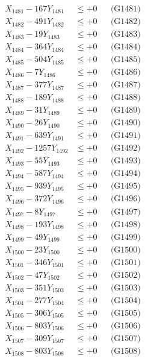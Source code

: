 \documentclass[a4paper,10pt]{article}
\begin{document}
{\begin{align}
\allowbreak
X_{1481} - 167Y_{1481} &\leq +0 && \text{(G1481)} \\
X_{1482} - 491Y_{1482} &\leq +0 && \text{(G1482)} \\
X_{1483} - 19Y_{1483} &\leq +0 && \text{(G1483)} \\
X_{1484} - 364Y_{1484} &\leq +0 && \text{(G1484)} \\
X_{1485} - 504Y_{1485} &\leq +0 && \text{(G1485)} \\
X_{1486} - 7Y_{1486} &\leq +0 && \text{(G1486)} \\
X_{1487} - 377Y_{1487} &\leq +0 && \text{(G1487)} \\
X_{1488} - 189Y_{1488} &\leq +0 && \text{(G1488)} \\
X_{1489} - 31Y_{1489} &\leq +0 && \text{(G1489)} \\
X_{1490} - 26Y_{1490} &\leq +0 && \text{(G1490)} \\
\allowbreak
X_{1491} - 639Y_{1491} &\leq +0 && \text{(G1491)} \\
X_{1492} - 1257Y_{1492} &\leq +0 && \text{(G1492)} \\
X_{1493} - 55Y_{1493} &\leq +0 && \text{(G1493)} \\
X_{1494} - 587Y_{1494} &\leq +0 && \text{(G1494)} \\
X_{1495} - 939Y_{1495} &\leq +0 && \text{(G1495)} \\
X_{1496} - 372Y_{1496} &\leq +0 && \text{(G1496)} \\
X_{1497} - 8Y_{1497} &\leq +0 && \text{(G1497)} \\
X_{1498} - 193Y_{1498} &\leq +0 && \text{(G1498)} \\
X_{1499} - 49Y_{1499} &\leq +0 && \text{(G1499)} \\
X_{1500} - 23Y_{1500} &\leq +0 && \text{(G1500)} \\
\allowbreak
X_{1501} - 346Y_{1501} &\leq +0 && \text{(G1501)} \\
X_{1502} - 47Y_{1502} &\leq +0 && \text{(G1502)} \\
X_{1503} - 351Y_{1503} &\leq +0 && \text{(G1503)} \\
X_{1504} - 277Y_{1504} &\leq +0 && \text{(G1504)} \\
X_{1505} - 306Y_{1505} &\leq +0 && \text{(G1505)} \\
X_{1506} - 803Y_{1506} &\leq +0 && \text{(G1506)} \\
X_{1507} - 309Y_{1507} &\leq +0 && \text{(G1507)} \\
X_{1508} - 803Y_{1508} &\leq +0 && \text{(G1508)} \\

\end{align}}
\end{document}
